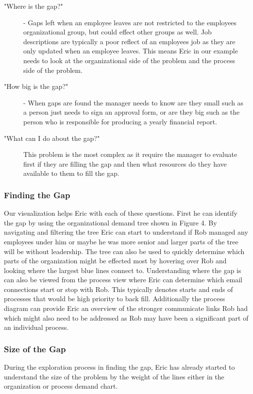 \documentclass[journal]{vgtc}                %
\begin{document}
\begin{description}
	\item ["Where is the gap?"] - Gaps left when an employee leaves are not restricted to the employees organizational group, but could effect other groups as well.  Job descriptions are typically a poor reflect of an employees job as they are only updated when an employee leaves.  This means Eric in our example needs to look at the organizational side of the problem and the process side of the problem.
	\item ["How big is the gap?"] - When gaps are found the manager needs to know are they small such as a person just needs to sign an approval form, or are they big such as the person who is responsible for producing a yearly financial report.
	\item ["What can I do about the gap?"] This problem is the most complex as it require the manager to evaluate first if they are filling the gap and then what resources do they have available to them to fill the gap.
\end{description}

\subsubsection{Finding the Gap}
Our visualization helps Eric with each of these questions.  First he can identify the gap by using the organizational demand tree shown in Figure 4.  By navigating and filtering the tree Eric can start to understand if Rob managed any employees under him or maybe he was more senior and larger parts of the tree will be without leadership.  The tree can also be used to quickly determine which parts of the organization might be effected most by hovering over Rob and looking where the largest blue lines connect to.
Understanding where the gap is can also be viewed from the process view where Eric can determine which email connections start or stop with Rob.  This typically denotes starts and ends of processes that would be high priority to back fill.  Additionally the process diagram can provide Eric an overview of the stronger communicate links Rob had which might also need to be addressed as Rob may have been a significant part of an individual process.

\subsubsection{Size of the Gap}
During the exploration process in finding the gap, Eric has already started to understand the size of the problem by the weight of the lines either in the organization or process demand chart.
\end{document}

